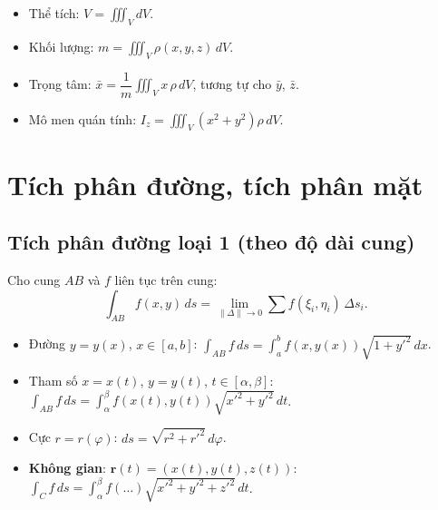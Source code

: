 \documentclass[12pt,a4paper]{article}
\begin{document}
\begin{congthuc}[title={Ứng dụng}]
  \begin{itemize}
    \item Thể tích: $V = \displaystyle\iiint_V dV$.
    \item Khối lượng: $m = \displaystyle\iiint_V \rho(x,y,z)\,dV$.
    \item Trọng tâm: $\bar{x} = \dfrac{1}{m}\displaystyle\iiint_V x\,\rho\,dV$, tương tự cho $\bar{y}$, $\bar{z}$.
    \item Mô men quán tính: $I_z = \displaystyle\iiint_V (x^2+y^2)\rho\,dV$.
  \end{itemize}
\end{congthuc}

\section{Tích phân đường, tích phân mặt}

\subsection{Tích phân đường loại 1 (theo độ dài cung)}

\begin{dinhnghia}
  Cho cung $AB$ và $f$ liên tục trên cung:
  \[
    \int_{AB} f(x,y)\,ds = \lim_{\|\Delta\| \to 0} \sum f(\xi_i, \eta_i)\,\Delta s_i.
  \]
\end{dinhnghia}

\begin{congthuc}[title={Cách tính}]
  \begin{itemize}
    \item Đường $y = y(x)$, $x \in [a,b]$: $\displaystyle\int_{AB} f\,ds = \int_a^b f(x, y(x))\sqrt{1 + y'^2}\,dx$.
    \item Tham số $x = x(t)$, $y = y(t)$, $t \in [\alpha, \beta]$:
      $\displaystyle\int_{AB} f\,ds = \int_\alpha^\beta f(x(t), y(t))\sqrt{x'^2 + y'^2}\,dt$.
    \item Cực $r = r(\varphi)$: $ds = \sqrt{r^2 + r'^2}\,d\varphi$.
    \item \textbf{Không gian}: $\mathbf{r}(t) = (x(t), y(t), z(t))$:
      $\displaystyle\int_C f\,ds = \int_\alpha^\beta f(\ldots)\sqrt{x'^2 + y'^2 + z'^2}\,dt$.
  \end{itemize}
\end{congthuc}
\end{document}
